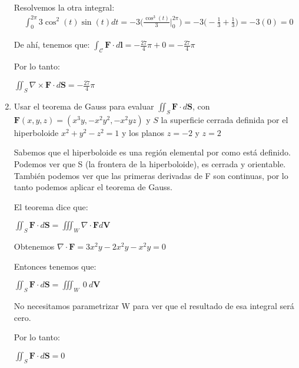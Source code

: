 \documentclass{article}
\begin{document}
\begin{enumerate}
{		Resolvemos la otra integral:
		\begin{align*}
                &\int_{0}^{2\pi}{3\cos^2(t)\sin(t)dt}
                = -3\Big( \frac{\cos^3(t)}{3}\Big |_{0}^{2\pi}\Big)
                = -3 \Big(-\frac{1}{3} + \frac{1}{3}\Big)
               	= -3 (0)
               	= 0
            \end{align*}

		De ahí, tenemos que:
		$\int_{\mathcal{C}} \mathbf{F} \cdot d\mathbf{l} = -\frac{27}{4}\pi + 0 = -\frac{27}{4}\pi$

		Por lo tanto:

		$\iint_{S} \nabla \times \mathbf{F} \cdot d\mathbf{S} = -\frac{27}{4}\pi$

        }

        \item {
            Usar el teorema de Gauss para evaluar $\iint_{S} \mathbf{F} \cdot d\mathbf{S}$, con $\mathbf{F}(x,y,z) = (x^3y,-x^2y^2,-x^2yz)$ y $S$ la superficie cerrada definida por el hiperboloide $x^2 + y^2 - z^2 = 1$ y los planos $z = -2$ y $z = 2$

            \color{azul}
            Sabemos que el hiperboloide es una región elemental por como está definido. Podemos ver que S (la frontera de la hiperboloide), es cerrada y orientable. También podemos ver que las primeras derivadas de F son continuas, por lo tanto podemos aplicar el teorema de Gauss.

            El teorema dice que:

            $\iint_{S} \mathbf{F} \cdot d\mathbf{S} = \iiint_{W} \nabla \cdot \mathbf{F} d\mathbf{V}$

            Obtenemos $\nabla \cdot \mathbf{F} = 3x^2y - 2x^2y - x^2y = 0$

            Entonces tenemos que:

             $\iint_{S} \mathbf{F} \cdot d\mathbf{S} = \iiint_{W} \ 0 \  d\mathbf{V}$

            No necesitamos parametrizar W para ver que el resultado de esa integral será cero.

            Por lo tanto:

            $\iint_{S} \mathbf{F} \cdot d\mathbf{S} = 0$



        }


\end{enumerate}
\end{document}
